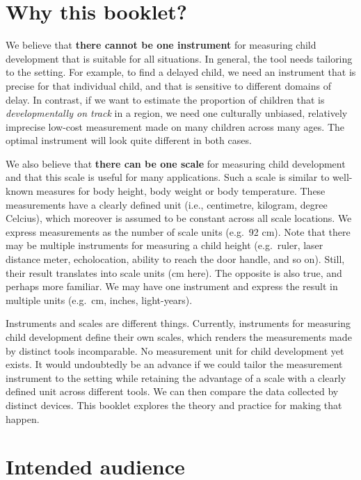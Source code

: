 \documentclass[
]{book}
\begin{document}
\hypertarget{sec:why}{%
\section{Why this booklet?}\label{sec:why}}

We believe that \textbf{there cannot be one instrument} for measuring child development that is suitable for all situations. In general, the tool needs tailoring to the setting. For example, to find a delayed child, we need an instrument that is precise for that individual child, and that is sensitive to different domains of delay. In contrast, if we want to estimate the proportion of children that is \emph{developmentally on track} in a region, we need one culturally unbiased, relatively imprecise low-cost measurement made on many children across many ages. The optimal instrument will look quite different in both cases.

We also believe that \textbf{there can be one scale} for measuring child development and that this scale is useful for many applications. Such a scale is similar to well-known measures for body height, body weight or body temperature. These measurements have a clearly defined unit (i.e., centimetre, kilogram, degree Celcius), which moreover is assumed to be constant across all scale locations. We express measurements as the number of scale units (e.g.~92 cm). Note that there may be multiple instruments for measuring a child height (e.g.~ruler, laser distance meter, echolocation, ability to reach the door handle, and so on). Still, their result translates into scale units (cm here). The opposite is also true, and perhaps more familiar. We may have one instrument and express the result in multiple units (e.g.~cm, inches, light-years).

Instruments and scales are different things. Currently, instruments for measuring child development define their own scales, which renders the measurements made by distinct tools incomparable. No measurement unit for child development yet exists. It would undoubtedly be an advance if we could tailor the measurement instrument to the setting while retaining the advantage of a scale with a clearly defined unit across different tools. We can then compare the data collected by distinct devices. This booklet explores the theory and practice for making that happen.

\hypertarget{sec:audience}{%
\section{Intended audience}\label{sec:audience}}
\end{document}
